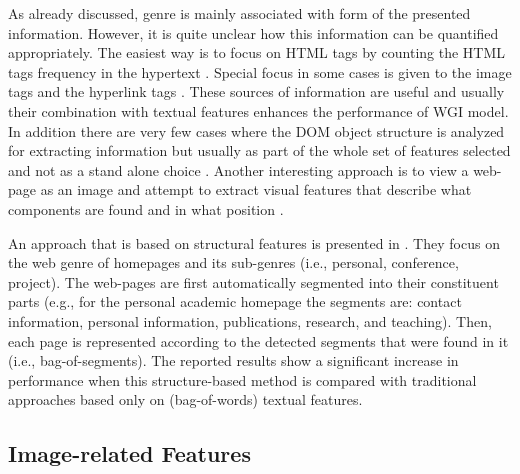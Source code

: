 As already discussed, genre is mainly associated with form of the presented information. However, it is quite unclear how this information can be quantified appropriately. The easiest way is to focus on HTML tags by counting the HTML tags frequency in the hypertext \parencite{kanaris2009learning}. Special focus in some cases is given to the image tags and the hyperlink tags \parencite{Lim2005,levering2008using}. These sources of information are useful and usually their combination with textual features enhances the performance of
WGI model. In addition there are very few cases where the DOM object structure is analyzed for extracting information but usually as part of the whole set of features selected and not as a stand alone choice \parencite{mehler2011integrating}. Another interesting approach is to view a web-page as an image and attempt to extract visual features that describe what components are found and in what position \parencite{levering2008using}.



An approach that is based on structural features is presented in \parencite{mehler2011integrating}. They focus on the web genre of homepages and its sub-genres (i.e., personal, conference, project). The web-pages are first automatically segmented into their constituent parts (e.g., for the personal academic homepage the segments are: contact information, personal information, publications, research, and teaching). Then, each page is represented according to the detected segments that were found in it (i.e., bag-of-segments). The reported results show a significant increase in performance when this structure-based method is compared with traditional approaches based only on (bag-of-words) textual features.

\subsection{Image-related Features} 

